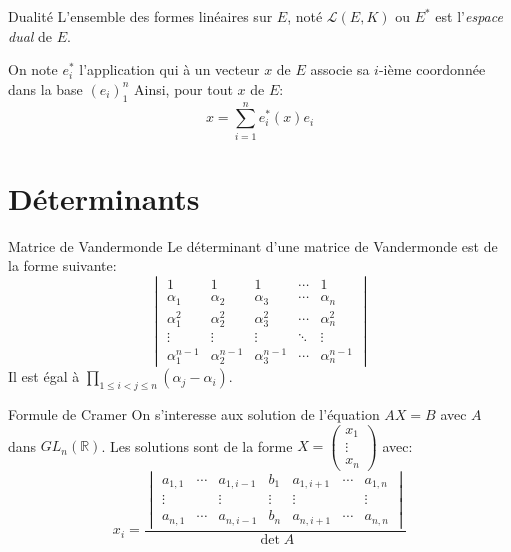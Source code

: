 \documentclass[french, a4paper, 11pt, twocolumn]{article}
\newcommand{\R}{\mathbb{R}}   %
\begin{document}
\begin{theoreme}{Dualité}
  L'ensemble des formes linéaires sur $E$, noté $\mathcal L(E, K)$ ou $E^{*}$ est l'\emph{espace dual} de $E$.

  On note $e_{i}^{*}$ l'application qui à un vecteur $x$ de $E$ associe sa $i$-ième coordonnée dans la base $(e_{i})_{1}^{n}$
  Ainsi, pour tout $x$ de $E$:
  \[x = \sum_{i=1}^n e_{i}^{*}(x)e_{i}\]
\end{theoreme}

\section{Déterminants}
\begin{theoreme}{Matrice de Vandermonde}
  Le déterminant d'une matrice de Vandermonde est de la forme suivante:
  \[\begin{vmatrix}
      1                & 1                & 1                & \cdots & 1              \\
      \alpha_{1}       & \alpha_{2}       & \alpha_{3}       & \cdots & \alpha_{n}     \\
      \alpha_{1}^{2}   & \alpha_{2}^{2}   & \alpha_{3}^{2}   & \cdots & \alpha_{n}^{2} \\
      \vdots           & \vdots           & \vdots           & \ddots & \vdots         \\
      \alpha_{1}^{n-1} & \alpha_{2}^{n-1} & \alpha_{3}^{n-1} & \cdots & \alpha_{n}^{n-1}
    \end{vmatrix}\]
  Il est égal à $\prod\limits_{1\leqslant i < j \leqslant n}(\alpha_{j}-\alpha_{i})$.
\end{theoreme}

\begin{theoreme}{Formule de Cramer}
  On s'interesse aux solution de l'équation $AX=B$ avec $A$ dans $GL_{n}(\R)$.
  Les solutions sont de la forme $X = \begin{pmatrix}x_{1}                   \\ \vdots\\ x_{n}\end{pmatrix}$ avec:
  \[x_{i} = \dfrac{
      \begin{vmatrix}
        a_{1,1} & \cdots & a_{1,i-1} & b_{1}  & a_{1,i+1} & \cdots & a_{1,n} \\
        \vdots  &        & \vdots    & \vdots & \vdots    &        & \vdots  \\
        a_{n,1} & \cdots & a_{n,i-1} & b_{n}  & a_{n,i+1} & \cdots & a_{n,n}
      \end{vmatrix}}{\det A}\]
\end{theoreme}
\end{document}
